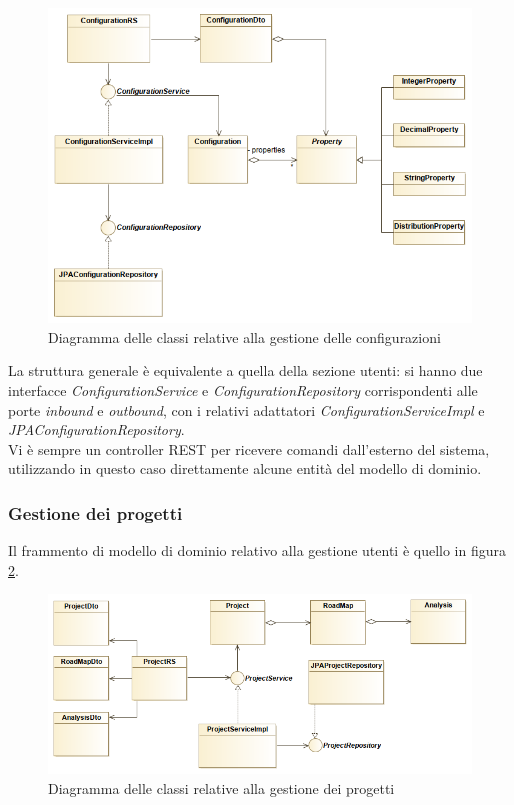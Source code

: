 \begin{figure}[h]
	\centering
	\includegraphics[width=\textwidth]{img/configurations_diagram}
	\caption{Diagramma delle classi relative alla gestione delle configurazioni}
	\label{fig:configurations_diagram}
\end{figure}

La struttura generale è equivalente a quella della sezione utenti: si hanno due interfacce \textit{ConfigurationService} e \textit{ConfigurationRepository} corrispondenti alle porte \textit{inbound} e \textit{outbound}, con i relativi adattatori \textit{ConfigurationServiceImpl} e \textit{JPAConfigurationRepository}.\\
Vi è sempre un controller REST per ricevere comandi dall'esterno del sistema, utilizzando in questo caso direttamente alcune entità del modello di dominio.

\subsubsection{Gestione dei progetti}
Il frammento di modello di dominio relativo alla gestione utenti è quello in figura \ref{fig:projects_diagram}.

\begin{figure}[h]
	\centering
	\includegraphics[width=\textwidth]{img/projects_diagram}
	\caption{Diagramma delle classi relative alla gestione dei progetti}
	\label{fig:projects_diagram}
\end{figure}

